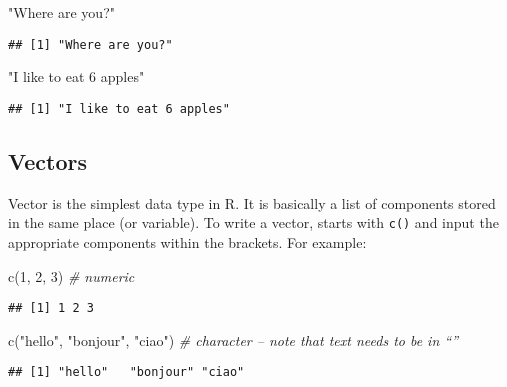 \documentclass[
]{book}
\newenvironment{Shaded}{\begin{snugshade}}{\end{snugshade}}
\newcommand{\CommentTok}[1]{\textcolor[rgb]{0.56,0.35,0.01}{\textit{#1}}}
\newcommand{\DecValTok}[1]{\textcolor[rgb]{0.00,0.00,0.81}{#1}}
\newcommand{\FunctionTok}[1]{\textcolor[rgb]{0.00,0.00,0.00}{#1}}
\newcommand{\NormalTok}[1]{#1}
\newcommand{\StringTok}[1]{\textcolor[rgb]{0.31,0.60,0.02}{#1}}
\begin{document}
\begin{Shaded}
\begin{Highlighting}[]
\StringTok{"Where are you?"}
\end{Highlighting}
\end{Shaded}

\begin{verbatim}
## [1] "Where are you?"
\end{verbatim}

\begin{Shaded}
\begin{Highlighting}[]
\StringTok{"I like to eat 6 apples"}
\end{Highlighting}
\end{Shaded}

\begin{verbatim}
## [1] "I like to eat 6 apples"
\end{verbatim}

\hypertarget{vectors}{%
\subsection{Vectors}\label{vectors}}

Vector is the simplest data type in R. It is basically a list of components stored in the same place (or variable). To write a vector, starts with \texttt{c()} and input the appropriate components within the brackets. For example:

\begin{Shaded}
\begin{Highlighting}[]
\FunctionTok{c}\NormalTok{(}\DecValTok{1}\NormalTok{, }\DecValTok{2}\NormalTok{, }\DecValTok{3}\NormalTok{) }\CommentTok{\# numeric}
\end{Highlighting}
\end{Shaded}

\begin{verbatim}
## [1] 1 2 3
\end{verbatim}

\begin{Shaded}
\begin{Highlighting}[]
\FunctionTok{c}\NormalTok{(}\StringTok{"hello"}\NormalTok{, }\StringTok{"bonjour"}\NormalTok{, }\StringTok{"ciao"}\NormalTok{) }\CommentTok{\# character – note that text needs to be in “”}
\end{Highlighting}
\end{Shaded}

\begin{verbatim}
## [1] "hello"   "bonjour" "ciao"
\end{verbatim}
\end{document}
